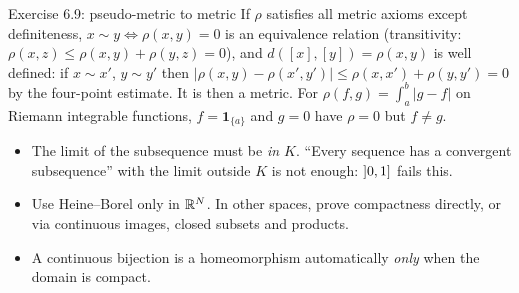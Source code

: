 \begin{example}{Exercise 6.9: pseudo-metric to metric}
If $\rho$ satisfies all metric axioms except definiteness, $x\sim y\iff\rho(x,y)=0$ is an
equivalence relation (transitivity: $\rho(x,z)\le\rho(x,y)+\rho(y,z)=0$), and
$d([x],[y])=\rho(x,y)$ is well defined: if $x\sim x'$, $y\sim y'$ then
$|\rho(x,y)-\rho(x',y')|\le\rho(x,x')+\rho(y,y')=0$ by the four-point estimate. It is then a
metric. For $\rho(f,g)=\int_a^b|g-f|$ on Riemann integrable functions, $f=\mathbf 1_{\{a\}}$
and $g=0$ have $\rho=0$ but $f\ne g$.
\end{example}

\begin{tip}
\begin{itemize}
\item The limit of the subsequence must be \emph{in $K$}. ``Every sequence has a convergent
  subsequence'' with the limit outside $K$ is not enough: $\mathopen{]}0,1\mathclose{]}$ fails this.
\item Use Heine--Borel only in $\mathbb R^N$. In other spaces, prove compactness directly, or via
  continuous images, closed subsets and products.
\item A continuous bijection is a homeomorphism automatically \emph{only} when the domain is
  compact.
\end{itemize}
\end{tip}
